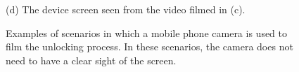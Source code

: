 \begin{figure}[!h]
{\begin{minipage}[t]{3.5cm}
             \footnotesize (d) The device screen seen from the video filmed in (c).
            \end{minipage}
        }
        \hspace{0.5cm}
        \vspace{-2mm}
        \caption{Examples of scenarios in which a mobile phone camera is used to film the unlocking process.
        In these scenarios, the camera does not need to have a clear sight of the screen.}
        \label{fig:fig1}
        \vspace{-5mm}
    \end{figure}


